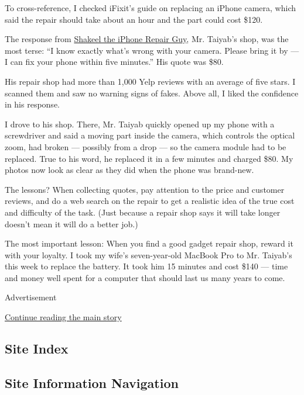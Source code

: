 To cross-reference, I checked iFixit's guide on replacing an iPhone
camera, which said the repair should take about an hour and the part
could cost \$120.

The response from
\href{https://www.yelp.com/biz/shakeel-the-iphone-repair-guy-south-san-francisco-2}{Shakeel
the iPhone Repair Guy}, Mr. Taiyab's shop, was the most terse: ``I know
exactly what's wrong with your camera. Please bring it by --- I can fix
your phone within five minutes.'' His quote was \$80.

His repair shop had more than 1,000 Yelp reviews with an average of five
stars. I scanned them and saw no warning signs of fakes. Above all, I
liked the confidence in his response.

I drove to his shop. There, Mr. Taiyab quickly opened up my phone with a
screwdriver and said a moving part inside the camera, which controls the
optical zoom, had broken --- possibly from a drop --- so the camera
module had to be replaced. True to his word, he replaced it in a few
minutes and charged \$80. My photos now look as clear as they did when
the phone was brand-new.

The lessons? When collecting quotes, pay attention to the price and
customer reviews, and do a web search on the repair to get a realistic
idea of the true cost and difficulty of the task. (Just because a repair
shop says it will take longer doesn't mean it will do a better job.)

The most important lesson: When you find a good gadget repair shop,
reward it with your loyalty. I took my wife's seven-year-old MacBook Pro
to Mr. Taiyab's this week to replace the battery. It took him 15 minutes
and cost \$140 --- time and money well spent for a computer that should
last us many years to come.

Advertisement

\protect\hyperlink{after-bottom}{Continue reading the main story}

\hypertarget{site-index}{%
\subsection{Site Index}\label{site-index}}

\hypertarget{site-information-navigation}{%
\subsection{Site Information
Navigation}\label{site-information-navigation}}

